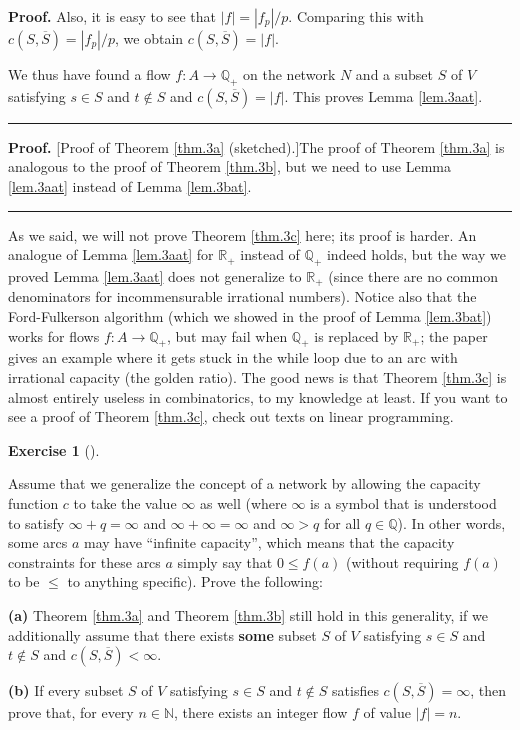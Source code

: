 \documentclass[numbers=enddot,12pt,final,onecolumn,notitlepage]{scrartcl}%
\newcounter{exer}
\theoremstyle{definition}
\newtheorem{exmp}[exer]{Exercise}
\newenvironment{exercise}[1][]
{\begin{exmp}[#1]\begin{leftbar}}
{\end{leftbar}\end{exmp}}
\newenvironment{proof}[1][Proof]{\noindent\textbf{#1.} }{\ \rule{0.5em}{0.5em}}
\begin{document}
\begin{proof}
Also, it is easy to see that $\left\vert f\right\vert =\left\vert
f_{p}\right\vert /p$. Comparing this with $c\left(  S,\overline{S}\right)
=\left\vert f_{p}\right\vert /p$, we obtain $c\left(  S,\overline{S}\right)
=\left\vert f\right\vert $.

We thus have found a flow $f:A\rightarrow\mathbb{Q}_{+}$ on the network $N$
and a subset $S$ of $V$ satisfying $s\in S$ and $t\notin S$ and $c\left(
S,\overline{S}\right)  =\left\vert f\right\vert $. This proves Lemma
\ref{lem.3aat}.
\end{proof}

\begin{proof}
[Proof of Theorem \ref{thm.3a} (sketched).]The proof of Theorem \ref{thm.3a}
is analogous to the proof of Theorem \ref{thm.3b}, but we need to use Lemma
\ref{lem.3aat} instead of Lemma \ref{lem.3bat}.
\end{proof}

As we said, we will not prove Theorem \ref{thm.3c} here; its proof is harder.
An analogue of Lemma \ref{lem.3aat} for $\mathbb{R}_{+}$ instead of
$\mathbb{Q}_{+}$ indeed holds, but the way we proved Lemma \ref{lem.3aat} does
not generalize to $\mathbb{R}_{+}$ (since there are no common denominators for
incommensurable irrational numbers). Notice also that the Ford-Fulkerson
algorithm (which we showed in the proof of Lemma \ref{lem.3bat}) works for
flows $f:A\rightarrow\mathbb{Q}_{+}$, but may fail when $\mathbb{Q}_{+}$ is
replaced by $\mathbb{R}_{+}$; the paper \cite{Zwick95} gives an example where
it gets stuck in the while loop due to an arc with irrational capacity (the
golden ratio). The good news is that Theorem \ref{thm.3c} is almost entirely
useless in combinatorics, to my knowledge at least. If you want to see a proof
of Theorem \ref{thm.3c}, check out texts on linear programming.

\begin{exercise}
Assume that we generalize the concept of a network by allowing the capacity
function $c$ to take the value $\infty$ as well (where $\infty$ is a symbol
that is understood to satisfy $\infty+q=\infty$ and $\infty+\infty=\infty$ and
$\infty>q$ for all $q\in\mathbb{Q}$). In other words, some arcs $a$ may have
\textquotedblleft infinite capacity\textquotedblright, which means that the
capacity constraints for these arcs $a$ simply say that $0\leq f\left(
a\right)  $ (without requiring $f\left(  a\right)  $ to be $\leq$ to anything
specific). Prove the following:

\textbf{(a)} Theorem \ref{thm.3a} and Theorem \ref{thm.3b} still hold in this
generality, if we additionally assume that there exists \textbf{some} subset
$S$ of $V$ satisfying $s\in S$ and $t\notin S$ and $c\left(  S,\overline
{S}\right)  <\infty$.

\textbf{(b)} If every subset $S$ of $V$ satisfying $s\in S$ and $t\notin S$
satisfies $c\left(  S,\overline{S}\right)  =\infty$, then prove that, for
every $n\in\mathbb{N}$, there exists an integer flow $f$ of value $\left\vert
f\right\vert =n$.
\end{exercise}
\end{document}
